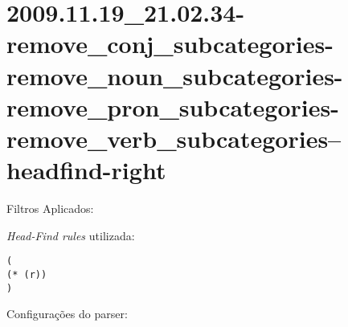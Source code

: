 \section{2009.11.19_21.02.34-remove_conj_subcategories-remove_noun_subcategories-remove_pron_subcategories-remove_verb_subcategories--headfind-right} %
\label{sec:exp:2009.11.19_21.02.34-remove_conj_subcategories-remove_noun_subcategories-remove_pron_subcategories-remove_verb_subcategories--headfind-right}

Filtros Aplicados:

\begin{itemize}
  
  \item{\emph{RemoveConjSubcategories}
  
  \item{\emph{RemoveNounSubcategories}
  
  \item{\emph{RemovePronSubcategories}
  
  \item{\emph{RemoveVerbSubcategories}
  
\end{itemize}

\emph{Head-Find rules} utilizada:

\scriptsize
\begin{verbatim}
(
(* (r))
)

\end{verbatim}

\normalsize

Configurações do parser:

